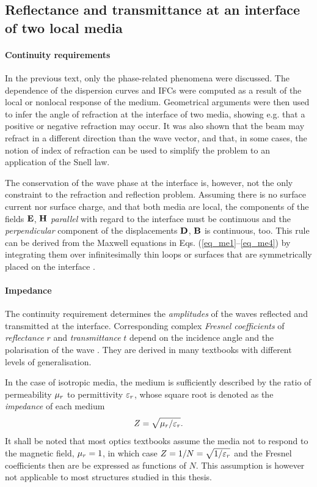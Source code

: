 
\subsection{Reflectance and transmittance at an interface of two local media}
\paragraph{Continuity requirements} %
In the previous text, only the phase-related phenomena were discussed. The dependence of the dispersion curves and IFCs were computed as a result of the local or nonlocal response of the medium. Geometrical arguments were then used to infer the angle of refraction at the interface of two media, showing e.g. that a positive or negative refraction may occur. It was also shown that the beam may refract in a different direction than the wave vector, and that, in some cases, the notion of index of refraction can be used to simplify the problem to an application of the Snell law.

The conservation of the wave phase at the interface is, however, not the only constraint to the refraction and reflection problem. Assuming there is no surface current nor surface charge, and that both media are local, the components of the fields $\mathbf{E}$, $\mathbf{H}$ \textit{parallel} with regard to the interface must be continuous and the \textit{perpendicular} component of the displacements $\mathbf{D}$, $\mathbf{B}$ is continuous, too. This rule can be derived from the Maxwell equations in Eqs. (\ref{eq_me1}--\ref{eq_me4}) by integrating them over infinitesimally thin loops or surfaces that are symmetrically placed on the interface \cite[pp. 26-29]{klingshirn2007semiconductor}. 

\paragraph{Impedance} %
The continuity requirement determines the \textit{amplitudes} of the waves reflected and transmitted at the interface. Corresponding complex \textit{Fresnel coefficients} of \textit{reflectance} $r$ and \textit{transmittance} $t$ depend on the incidence angle and the polarisation of the wave \cite[p. 38]{born1999book}. They are derived in many textbooks with different levels of generalisation. 

In the case of isotropic media, the medium is sufficiently described by the ratio of permeability $\mu_r$ to permittivity $\varepsilon_r$, whose square root is denoted as the \textit{impedance} of each medium 
\begin{equation} Z = \sqrt{\mu_r/\varepsilon_r}. \label{eq_Z}\end{equation}
It shall be noted that most optics textbooks assume the media not to respond to the magnetic field, $\mu_r=1$, in which case $Z = 1/N = \sqrt{1/\varepsilon_r}$ and the Fresnel coefficients then are be expressed as functions of $N$. This assumption is however not applicable to most structures studied in this thesis.

